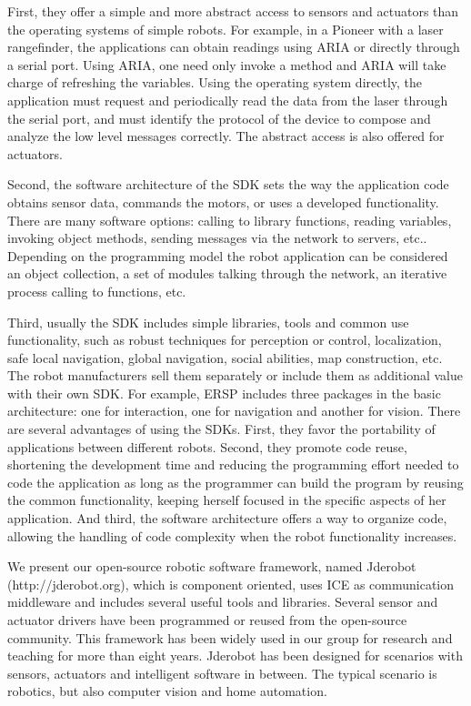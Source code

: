 \documentclass[twocolumn]{svjour3}          %
\begin{document}
First, they offer a simple and more abstract access to sensors and actuators than the operating systems of simple robots. For example, in a Pioneer with a laser rangefinder, the applications can obtain readings using ARIA or directly through a serial port. Using ARIA, one need only invoke a method and ARIA will take charge of refreshing the variables. Using the operating system directly, the application must request and periodically read the data from the laser through the serial port, and must identify the protocol of the
device to compose and analyze the low level messages correctly. The abstract access is also offered for actuators.

Second, the software architecture of the SDK sets the way the application code obtains sensor data, commands the motors, or uses a developed functionality. There are many software options: calling to library functions, reading variables, invoking object methods, sending messages via the network to servers, etc.. Depending on the programming model the robot application can be considered an object collection, a set of modules talking through the network, an iterative process calling to functions, etc.

Third, usually the SDK includes simple libraries, tools and common use functionality, such as robust techniques for perception or control, localization, safe local navigation, global navigation, social abilities, map construction, etc. The robot manufacturers sell them separately or include them as additional value with their own SDK. For example, ERSP includes three packages in the basic architecture: one for interaction, one for navigation and another for vision. There are several advantages of using the SDKs. First, they favor the portability of applications between different robots. Second, they promote code reuse, shortening the development time and reducing the programming effort needed to code the application as long as the programmer can build the program by reusing the common functionality, keeping herself focused in the specific aspects of her application. And third, the software architecture offers a way to organize code, allowing the handling of code complexity when the robot functionality increases.

We present our open-source robotic software framework, named Jderobot (http://jderobot.org), which is component oriented, uses ICE as communication middleware and includes several useful tools and libraries. Several sensor and actuator drivers have been programmed or reused from the open-source community. This framework has been widely used in our group for research and teaching for more than eight years. Jderobot has been designed for scenarios with sensors, actuators and intelligent software in between. The typical scenario is robotics, but also computer vision and home automation.
\end{document}
